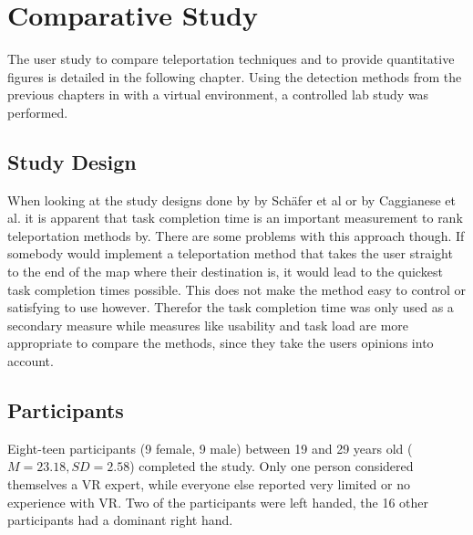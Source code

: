 \chapter{Comparative Study}
The user study to compare teleportation techniques and to provide quantitative figures is detailed in the following chapter. Using the detection methods from the previous chapters in with a virtual environment, a controlled lab study was performed. 




\section{Study Design}
When looking at the study designs done by by Schäfer et al \cite{Schafer2021} or by Caggianese et al. \cite{Caggianese} it is apparent that task completion time is an important measurement to rank teleportation methods by. There are some problems with this approach though. If somebody would implement a teleportation method that takes the user straight to the end of the map where their destination is, it would lead to the quickest task completion times possible. This does not make the method easy to control or satisfying to use however. Therefor the task completion time was only used as a secondary measure while measures like usability and task load are more appropriate to compare the methods, since they take the users opinions into account. 

\section{Participants}
Eight-teen participants (9 female, 9 male) between 19 and 29 years old ($M=23.18,SD=2.58$) completed the study. Only one person considered themselves a VR expert, while everyone else reported very limited or no experience with VR. Two of the participants were left handed, the 16 other participants had a dominant right hand. 



